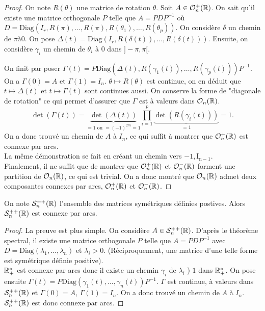 \documentclass[../main.tex]{subfiles}
\begin{document}
\begin{proof} On note \(R(\theta)\) une matrice de rotation \(\theta\).
    Soit \(A\in \mathcal{O}_n^+(\mathbb{R})\). On sait qu'il existe une matrice orthogonale \(P\)
    telle que \(A = PDP^{-1}\) où \(D = \mathrm{Diag}(I_r,R(\pi),\ldots,R(\pi),R(\theta_1),\ldots,R(\theta_p))\).
    On considère \(\delta\) un chemin de \(\pi à 0\). On pose \(\Delta(t) = \mathrm{Diag}(I_r,R(\delta(t)),\ldots,R(\delta(t)))\).
    Ensuite, on considère \(\gamma_{i}\) un chemin de \(\theta_i\) à \(0\) dans \(]-\pi,\pi[\).

    On finit par poser \(\Gamma(t) = P\mathrm{Diag}(\Delta(t),R(\gamma_1(t)),\ldots,R(\gamma_p(t)))P^{-1}\).
    On a \(\Gamma(0) = A\) et \(\Gamma(1)=I_n\). \(\theta\mapsto R(\theta)\) est continue, on en déduit que \(t\mapsto \Delta(t)\) et \(t\mapsto \Gamma(t)\) sont continues aussi.
    On conserve la forme de "diagonale de rotation" ce qui permet d'assurer que \(\Gamma\) est à valeurs dans \(\mathcal{O}_n(\mathbb{R})\).
    \begin{equation}
        \det(\Gamma(t)) = \underbrace{\det(\Delta(t))}_{=1\text{ ou } =(-1)^{2m}=1}\prod_{i=1}^p \underbrace{\det(R(\gamma_i(t)))}_{=1} = 1.
    \end{equation}
    On a donc trouvé un chemin de \(A\) à \(I_n\), ce qui suffit à montrer que \(\mathcal{O}_n^+(\mathbb{R})\) est connexe par arcs.\\

    La même démonstration se fait en créant un chemin vers \(\mathrm{-1,I_{n-1}}\).\\

    Finalement, il ne suffit que de montrer que \(\mathcal{O}_n^+(\mathbb{R})\) et \(\mathcal{O}_n^-(\mathbb{R})\) forment une partition de \(\mathcal{O}_n(\mathbb{R})\), ce qui est trivial.
    On a donc montré que \(\mathcal{O}_n(\mathbb{R})\) admet deux composantes connexes par arcs, \(\mathcal{O}_n^+(\mathbb{R})\) et \(\mathcal{O}_n^-(\mathbb{R})\).
\end{proof}
\begin{lemma} On note \(\mathcal{S}^{++}_n(\mathbb{R})\) l'ensemble des matrices symétriques définies
    postives. Alors \(\mathcal{S}^{++}_n(\mathbb{R})\) est connexe par arcs.
\end{lemma}
\begin{proof} La preuve est plus simple. On considère \(A\in \mathcal{S}_n^{++}(\mathbb{R})\).
    D'après le théorème spectral, il existe une matrice orthogonale \(P\) telle que
    \(A = PDP^{-1}\) avec \(D = \mathrm{Diag}(\lambda_1,\ldots,\lambda_n)\) et \(\lambda_i > 0\).
    (Réciproquement, une matrice d'une telle forme est symétrique définie positive).\\
    \(\mathbb{R}^*_+\) est connexe par arcs donc il existe un chemin \(\gamma_i\) de \(\lambda_i\) ) \(1\) dans \(\mathbb{R}^*_+\).
    On pose ensuite \(\Gamma(t) = P\mathrm{Diag}(\gamma_1(t),\ldots,\gamma_n(t))P^{-1}\).
    \(\Gamma\) est continue, à valeurs dans \(\mathcal{S}_n^{++}(\mathbb{R})\) et \(\Gamma(0) = A\), \(\Gamma(1) = I_n\).
    On a donc trouvé un chemin de \(A\) à \(I_n\). \(\mathcal{S}_n^{++}(\mathbb{R})\) est donc connexe par arcs.
\end{proof}
\end{document}
